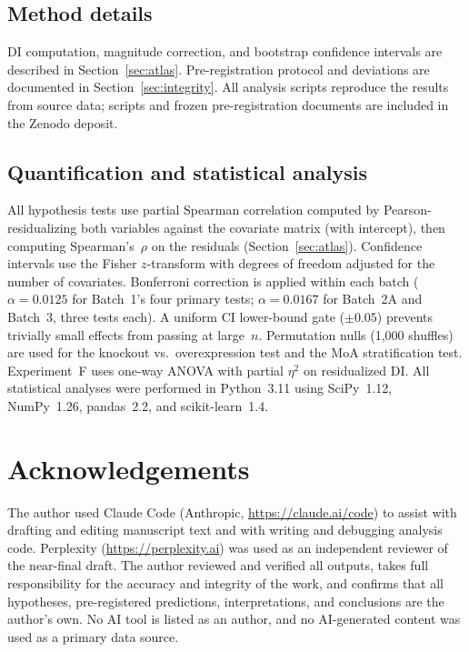 \documentclass[11pt]{article}
\begin{document}
\subsection*{Method details}

DI computation, magnitude correction, and bootstrap confidence intervals
are described in Section~\ref{sec:atlas}.  Pre-registration protocol and
deviations are documented in Section~\ref{sec:integrity}.  All analysis
scripts reproduce the results from source data; scripts and frozen
pre-registration documents are included in the Zenodo deposit.

\subsection*{Quantification and statistical analysis}

All hypothesis tests use partial Spearman correlation computed by
Pearson-residualizing both variables against the covariate matrix (with
intercept), then computing Spearman's~$\rho$ on the residuals
(Section~\ref{sec:atlas}).  Confidence intervals use the Fisher
$z$-transform with degrees of freedom adjusted for the number of
covariates.  Bonferroni correction is applied within each batch
($\alpha = 0.0125$ for Batch~1's four primary tests; $\alpha = 0.0167$
for Batch~2A and Batch~3, three tests each).  A uniform CI lower-bound
gate ($\pm 0.05$) prevents trivially small effects from passing at
large~$n$.  Permutation nulls (1{,}000 shuffles) are used for the
knockout vs.\ overexpression test and the MoA stratification test.
Experiment~F uses one-way ANOVA with partial $\eta^2$ on
residualized DI.  All statistical analyses were performed in Python~3.11
using SciPy~1.12, NumPy~1.26, pandas~2.2, and scikit-learn~1.4.

\section*{Acknowledgements}

The author used Claude Code (Anthropic, \url{https://claude.ai/code}) to
assist with drafting and editing manuscript text and with writing and
debugging analysis code. Perplexity (\url{https://perplexity.ai}) was
used as an independent reviewer of the near-final draft. The author
reviewed and verified all outputs, takes full responsibility for the
accuracy and integrity of the work, and confirms that all hypotheses,
pre-registered predictions, interpretations, and conclusions are the
author's own. No AI tool is listed as an author, and no AI-generated
content was used as a primary data source.
\end{document}
